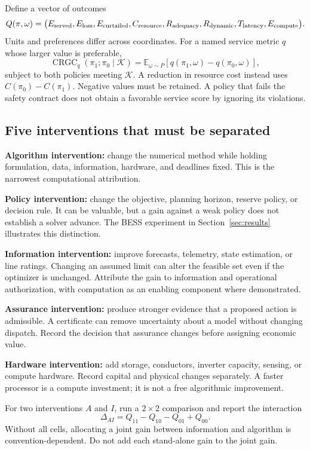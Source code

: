 \documentclass[11pt,letterpaper]{article}
\newcommand{\E}{\mathbb E}\newcommand{\R}{\mathbb R}\newcommand{\CRGC}{\operatorname{CRGC}}
\begin{document}
Define a vector of outcomes
\[
 Q(\pi,\omega)=
 \big(E_{\rm served},E_{\rm loss},E_{\rm curtailed},
 C_{\rm resource},R_{\rm adequacy},R_{\rm dynamic},
 T_{\rm latency},E_{\rm compute}\big).
\]
Units and preferences differ across coordinates. For a named service metric $q$ whose larger value is preferable,
\begin{equation}
 \CRGC_q(\pi_1;\pi_0\mid\mathcal K)
  =\E_{\omega\sim P}\!\left[q(\pi_1,\omega)-q(\pi_0,\omega)\right],
 \label{eq:crgc}
\end{equation}
subject to both policies meeting $\mathcal K$. A reduction in resource cost instead uses $C(\pi_0)-C(\pi_1)$. Negative values must be retained. A policy that fails the safety contract does not obtain a favorable service score by ignoring its violations.

\subsection{Five interventions that must be separated}
\textbf{Algorithm intervention:} change the numerical method while holding formulation, data, information, hardware, and deadlines fixed. This is the narrowest computational attribution.

\textbf{Policy intervention:} change the objective, planning horizon, reserve policy, or decision rule. It can be valuable, but a gain against a weak policy does not establish a solver advance. The BESS experiment in Section~\ref{sec:results} illustrates this distinction.

\textbf{Information intervention:} improve forecasts, telemetry, state estimation, or line ratings. Changing an assumed limit can alter the feasible set even if the optimizer is unchanged. Attribute the gain to information and operational authorization, with computation as an enabling component where demonstrated.

\textbf{Assurance intervention:} produce stronger evidence that a proposed action is admissible. A certificate can remove uncertainty about a model without changing dispatch. Record the decision that assurance changes before assigning economic value.

\textbf{Hardware intervention:} add storage, conductors, inverter capacity, sensing, or compute hardware. Record capital and physical changes separately. A faster processor is a compute investment; it is not a free algorithmic improvement.

For two interventions $A$ and $I$, run a $2\times2$ comparison and report the interaction
\[
 \Delta_{AI}=Q_{11}-Q_{10}-Q_{01}+Q_{00}.
\]
Without all cells, allocating a joint gain between information and algorithm is convention-dependent. Do not add each stand-alone gain to the joint gain.
\end{document}
